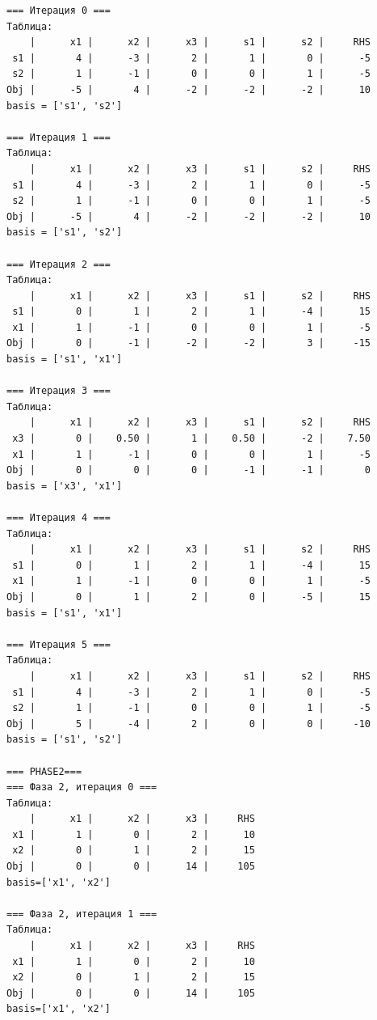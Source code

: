 \documentclass[a4paper,12pt]{article}
\begin{document}
\begin{verbatim}
=== Итерация 0 ===
Таблица:
    |      x1 |      x2 |      x3 |      s1 |      s2 |     RHS
 s1 |       4 |      -3 |       2 |       1 |       0 |      -5
 s2 |       1 |      -1 |       0 |       0 |       1 |      -5
Obj |      -5 |       4 |      -2 |      -2 |      -2 |      10
basis = ['s1', 's2']

=== Итерация 1 ===
Таблица:
    |      x1 |      x2 |      x3 |      s1 |      s2 |     RHS
 s1 |       4 |      -3 |       2 |       1 |       0 |      -5
 s2 |       1 |      -1 |       0 |       0 |       1 |      -5
Obj |      -5 |       4 |      -2 |      -2 |      -2 |      10
basis = ['s1', 's2']

=== Итерация 2 ===
Таблица:
    |      x1 |      x2 |      x3 |      s1 |      s2 |     RHS
 s1 |       0 |       1 |       2 |       1 |      -4 |      15
 x1 |       1 |      -1 |       0 |       0 |       1 |      -5
Obj |       0 |      -1 |      -2 |      -2 |       3 |     -15
basis = ['s1', 'x1']

=== Итерация 3 ===
Таблица:
    |      x1 |      x2 |      x3 |      s1 |      s2 |     RHS
 x3 |       0 |    0.50 |       1 |    0.50 |      -2 |    7.50
 x1 |       1 |      -1 |       0 |       0 |       1 |      -5
Obj |       0 |       0 |       0 |      -1 |      -1 |       0
basis = ['x3', 'x1']

=== Итерация 4 ===
Таблица:
    |      x1 |      x2 |      x3 |      s1 |      s2 |     RHS
 s1 |       0 |       1 |       2 |       1 |      -4 |      15
 x1 |       1 |      -1 |       0 |       0 |       1 |      -5
Obj |       0 |       1 |       2 |       0 |      -5 |      15
basis = ['s1', 'x1']

=== Итерация 5 ===
Таблица:
    |      x1 |      x2 |      x3 |      s1 |      s2 |     RHS
 s1 |       4 |      -3 |       2 |       1 |       0 |      -5
 s2 |       1 |      -1 |       0 |       0 |       1 |      -5
Obj |       5 |      -4 |       2 |       0 |       0 |     -10
basis = ['s1', 's2']

=== PHASE2===
=== Фаза 2, итерация 0 ===
Таблица:
    |      x1 |      x2 |      x3 |     RHS
 x1 |       1 |       0 |       2 |      10
 x2 |       0 |       1 |       2 |      15
Obj |       0 |       0 |      14 |     105
basis=['x1', 'x2']

=== Фаза 2, итерация 1 ===
Таблица:
    |      x1 |      x2 |      x3 |     RHS
 x1 |       1 |       0 |       2 |      10
 x2 |       0 |       1 |       2 |      15
Obj |       0 |       0 |      14 |     105
basis=['x1', 'x2']

\end{verbatim}
\end{document}
